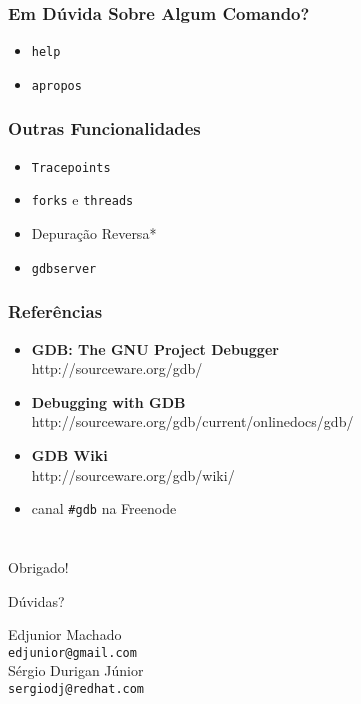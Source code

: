 \documentclass[xcolor=pdftex,dvipsnames,table,t]{beamer}
\begin{document}
\begin{frame}[fragile]
	\frametitle{Em Dúvida Sobre Algum Comando?}
	  \begin{itemize}
	    \item{\verb|help|}
	    \item{\verb|apropos|}
	  \end{itemize}
\end{frame}

\begin{frame}[fragile]
	\frametitle{Outras Funcionalidades}
	  \begin{itemize}
	    \item{\verb|Tracepoints|}
	    \item{\verb|forks| e \verb|threads|}
	    \item{Depuração Reversa*}
	    \item{\verb|gdbserver|}
	  \end{itemize}
\end{frame}

\begin{frame}
       \frametitle{Referências}
        \begin{center}
        \begin{itemize}
		\item \textbf{GDB: The GNU Project Debugger} \\
		http://sourceware.org/gdb/
		\item \textbf{Debugging with GDB} \\
		http://sourceware.org/gdb/current/onlinedocs/gdb/
		\item \textbf{GDB Wiki} \\
		http://sourceware.org/gdb/wiki/
		\item canal \texttt{\#gdb} na Freenode
	\end{itemize}
        \end{center}
\end{frame}

\section{}
\begin{frame}
	\begin{center}
	\LARGE
	\alert{Obrigado!}

	Dúvidas?


	\vspace{2\baselineskip}

	\small
	Edjunior Machado \\
	{\tt edjunior@gmail.com} \\
	\vspace{1\baselineskip}
	Sérgio Durigan Júnior \\
	{\tt sergiodj@redhat.com}
	\end{center}
\end{frame}
\end{document}
